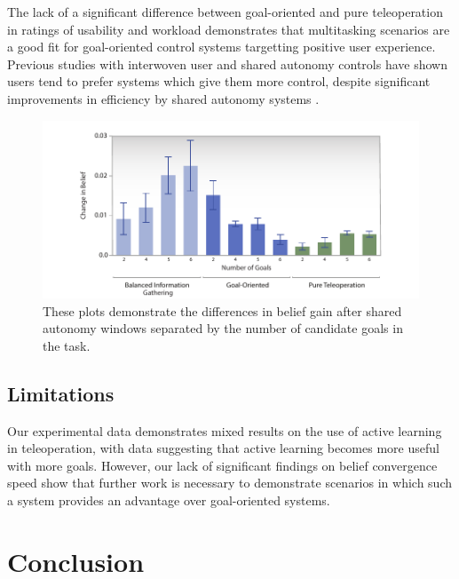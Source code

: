 \documentclass[conference]{IEEEtran}
\begin{document}
The lack of a significant difference between goal-oriented and pure teleoperation in ratings of usability and workload demonstrates that multitasking scenarios are a good fit for goal-oriented control systems targetting positive user experience. Previous studies with interwoven user and shared autonomy controls have shown users tend to prefer systems which give them more control, despite significant improvements in efficiency by shared autonomy systems \cite{javdani2015shared, javdani2018shared}.

\begin{figure}
\includegraphics[width=\columnwidth]{figures/Info_Gain_By_Goal.pdf}
\caption{These plots demonstrate the differences in belief gain after shared autonomy windows separated by the number of candidate goals in the task.}
\label{goal_effect}
\end{figure}

\subsection{Limitations}

Our experimental data demonstrates mixed results on the use of active learning in teleoperation, with data suggesting that active learning becomes more useful with more goals. However, our lack of significant findings on belief convergence speed show that further work is necessary to demonstrate scenarios in which such a system provides an advantage over goal-oriented systems.

\section{Conclusion}
\end{document}
